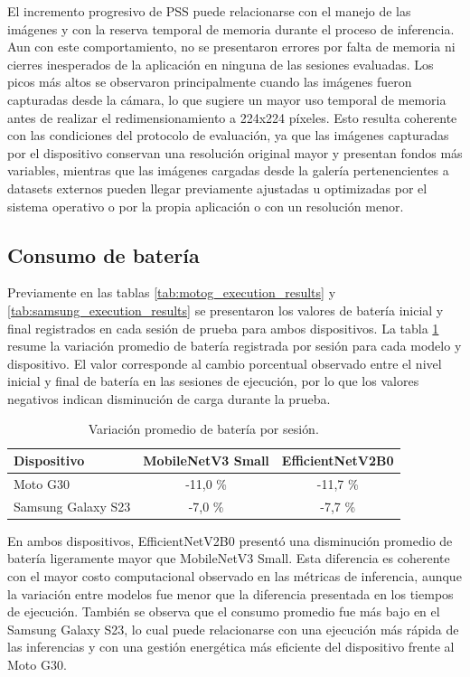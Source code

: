 El incremento progresivo de PSS puede relacionarse con el manejo de las imágenes y con la reserva temporal de memoria durante el proceso
de inferencia. Aun con este comportamiento, no se presentaron errores por falta de memoria ni cierres inesperados de la aplicación en
ninguna de las sesiones evaluadas. Los picos más altos se observaron principalmente cuando las imágenes fueron capturadas desde la cámara,
lo que sugiere un mayor uso temporal de memoria antes de realizar el redimensionamiento a 224x224 píxeles. Esto resulta coherente con las
condiciones del protocolo de evaluación, ya que las imágenes capturadas por el dispositivo conservan una resolución original mayor y
presentan fondos más variables, mientras que las imágenes cargadas desde la galería pertenencientes a datasets externos pueden llegar previamente
ajustadas u optimizadas por el sistema operativo o por la propia aplicación o con un resolución menor.


\subsection{Consumo de batería}

Previamente en las tablas \ref{tab:motog_execution_results} y \ref{tab:samsung_execution_results} se presentaron los valores de batería inicial y final 
registrados en cada sesión de prueba para ambos dispositivos.
La tabla \ref{tab:battery_consumption_average} resume la variación promedio de batería registrada por sesión para cada modelo y
dispositivo. El valor corresponde al cambio porcentual observado entre el nivel inicial y final de batería en las sesiones de ejecución,
por lo que los valores negativos indican disminución de carga durante la prueba.

\begin{table}[H]
    \centering
    \caption{Variación promedio de batería por sesión.\label{tab:battery_consumption_average}}
    \begin{tabular}{|l|c|c|}
        \hline
        \textbf{Dispositivo} & \textbf{MobileNetV3 Small} & \textbf{EfficientNetV2B0} \\
        \hline
        Moto G30 & -11,0 \% & -11,7 \% \\
        \hline
        Samsung Galaxy S23 & -7,0 \% & -7,7 \% \\
        \hline
    \end{tabular}
\end{table}

En ambos dispositivos, EfficientNetV2B0 presentó una disminución promedio de batería ligeramente mayor que MobileNetV3 Small. Esta
diferencia es coherente con el mayor costo computacional observado en las métricas de inferencia, aunque la variación entre modelos fue
menor que la diferencia presentada en los tiempos de ejecución. También se observa que el consumo promedio fue más bajo en el Samsung
Galaxy S23, lo cual puede relacionarse con una ejecución más rápida de las inferencias y con una gestión energética más eficiente del
dispositivo frente al Moto G30.

